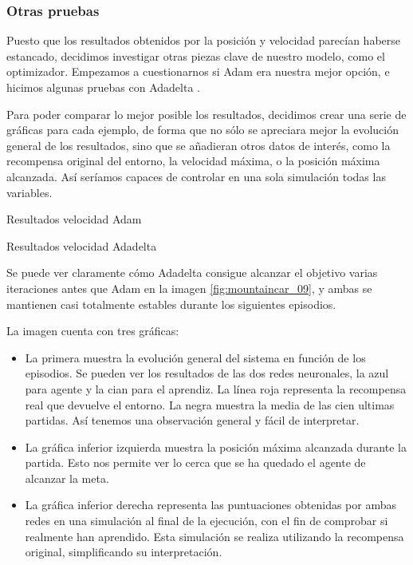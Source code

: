\subsubsection*{Otras pruebas}

Puesto que los resultados obtenidos por la posición y velocidad parecían haberse estancado, decidimos investigar otras piezas clave de nuestro modelo, como el optimizador. Empezamos a cuestionarnos si Adam \citep{kingma2014adam} era nuestra mejor opción, e hicimos algunas pruebas con Adadelta \citep{NIPS2017_7003}.

Para poder comparar lo mejor posible los resultados, decidimos crear una serie de gráficas para cada ejemplo, de forma que no sólo se apreciara mejor la evolución general de los resultados, sino que se añadieran otros datos de interés, como la recompensa original del entorno, la velocidad máxima, o la posición máxima alcanzada. Así seríamos capaces de controlar en una sola simulación todas las variables.

%
       {Resultados velocidad Adam}

%
       {Resultados velocidad Adadelta}

Se puede ver claramente cómo Adadelta consigue alcanzar el objetivo varias iteraciones antes que Adam en la imagen \ref{fig:mountaincar_09}, y ambas se mantienen casi totalmente estables durante los siguientes episodios.

       
La imagen cuenta con tres gráficas:
\begin{itemize}
    \item La primera muestra la evolución general del sistema en función de los episodios. Se pueden ver los resultados de las dos redes neuronales, la azul para agente y la cian para el aprendiz. La línea roja representa la recompensa real que devuelve el entorno. La negra muestra la media de las cien ultimas partidas. Así tenemos una observación general y fácil de interpretar.
    \item La gráfica inferior izquierda muestra la posición máxima alcanzada durante la partida. Esto nos permite ver lo cerca que se ha quedado el agente de alcanzar la meta.
    \item La gráfica inferior derecha representa las puntuaciones obtenidas por ambas redes en una simulación al final de la ejecución, con el fin de comprobar si realmente han aprendido. Esta simulación se realiza utilizando la recompensa original, simplificando su interpretación.  
\end{itemize}

